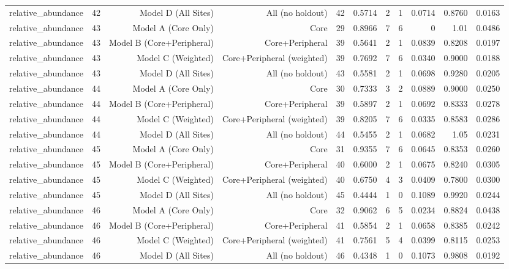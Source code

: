 {\begin{longtable}{lrrrrrrrrrr}
  relative\_abundance & 42 & Model D (All Sites) & All (no holdout) & 42 & 0.5714 & 2 & 1 & 0.0714 & 0.8760 & 0.0163 \\
  relative\_abundance & 43 & Model A (Core Only) & Core & 29 & 0.8966 & 7 & 6 & 0 & 1.01 & 0.0486 \\
  relative\_abundance & 43 & Model B (Core+Peripheral) & Core+Peripheral & 39 & 0.5641 & 2 & 1 & 0.0839 & 0.8208 & 0.0197 \\
  relative\_abundance & 43 & Model C (Weighted) & Core+Peripheral (weighted) & 39 & 0.7692 & 7 & 6 & 0.0340 & 0.9000 & 0.0188 \\
  relative\_abundance & 43 & Model D (All Sites) & All (no holdout) & 43 & 0.5581 & 2 & 1 & 0.0698 & 0.9280 & 0.0205 \\
  relative\_abundance & 44 & Model A (Core Only) & Core & 30 & 0.7333 & 3 & 2 & 0.0889 & 0.9000 & 0.0250 \\
  relative\_abundance & 44 & Model B (Core+Peripheral) & Core+Peripheral & 39 & 0.5897 & 2 & 1 & 0.0692 & 0.8333 & 0.0278 \\
  relative\_abundance & 44 & Model C (Weighted) & Core+Peripheral (weighted) & 39 & 0.8205 & 7 & 6 & 0.0335 & 0.8583 & 0.0286 \\
  relative\_abundance & 44 & Model D (All Sites) & All (no holdout) & 44 & 0.5455 & 2 & 1 & 0.0682 & 1.05 & 0.0231 \\
  relative\_abundance & 45 & Model A (Core Only) & Core & 31 & 0.9355 & 7 & 6 & 0.0645 & 0.8353 & 0.0260 \\
  relative\_abundance & 45 & Model B (Core+Peripheral) & Core+Peripheral & 40 & 0.6000 & 2 & 1 & 0.0675 & 0.8240 & 0.0305 \\
  relative\_abundance & 45 & Model C (Weighted) & Core+Peripheral (weighted) & 40 & 0.6750 & 4 & 3 & 0.0409 & 0.7800 & 0.0300 \\
  relative\_abundance & 45 & Model D (All Sites) & All (no holdout) & 45 & 0.4444 & 1 & 0 & 0.1089 & 0.9920 & 0.0244 \\
  relative\_abundance & 46 & Model A (Core Only) & Core & 32 & 0.9062 & 6 & 5 & 0.0234 & 0.8824 & 0.0438 \\
  relative\_abundance & 46 & Model B (Core+Peripheral) & Core+Peripheral & 41 & 0.5854 & 2 & 1 & 0.0658 & 0.8385 & 0.0242 \\
  relative\_abundance & 46 & Model C (Weighted) & Core+Peripheral (weighted) & 41 & 0.7561 & 5 & 4 & 0.0399 & 0.8115 & 0.0253 \\
  relative\_abundance & 46 & Model D (All Sites) & All (no holdout) & 46 & 0.4348 & 1 & 0 & 0.1073 & 0.9808 & 0.0192 \\

\end{longtable}}
